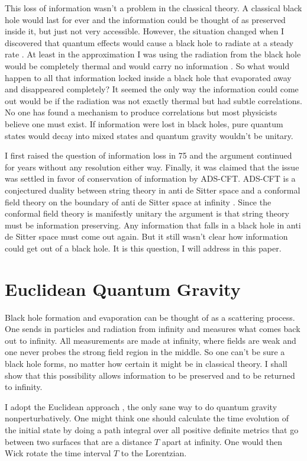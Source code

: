 \documentclass[aps,prd,groupedaddress,showpacs,12pt]{revtex4-1}
\begin{document}
This loss of information wasn't a problem in the classical theory. A classical black hole would last for ever and the information could be thought of as preserved inside it, but just not very accessible. However, the situation changed when I discovered that quantum effects would cause a black hole to radiate at a steady rate \cite{Stephen1}. At least in the approximation I was using the radiation from the black hole would be completely thermal and would carry no information \cite{Stephen2}. So what would happen to all that information locked inside a black hole that evaporated away and disappeared completely?  It seemed the only way the information could come out would be if the radiation was not exactly thermal but had subtle correlations. No one has found a mechanism to produce correlations but most physicists believe one must exist. If information were lost in black holes, pure quantum states would decay into mixed states and quantum gravity wouldn't be unitary.

I first raised the question of information loss in 75 and the argument continued for years without any resolution either way. Finally, it was claimed that the issue was settled in favor of conservation of information by ADS-CFT. 
ADS-CFT is a conjectured duality between string theory in anti de Sitter space and a conformal field theory on the boundary of anti de Sitter space at infinity \cite{ADSCFTreviews }. Since the conformal field theory is manifestly unitary the argument is that string theory must be information preserving. Any information that falls in a black hole in anti de Sitter space must come out again. But it still wasn't clear how information could get out of a black hole. It is this question, I will address in this paper. 

\section{Euclidean Quantum Gravity}


Black hole formation and evaporation can be thought of as a scattering process. One sends in particles and radiation from infinity and measures what comes back out to infinity. All measurements are made at infinity, where fields are weak and one never probes the strong field region in the middle. So one can't be sure a black hole forms, no matter how certain it might be in classical theory. I shall show that this possibility allows information to be preserved and to be returned to infinity. 

I adopt the Euclidean approach \cite{EQG}, the only sane way to do quantum gravity nonperturbatively. One might think one should calculate the time evolution of the initial state by doing a path integral over all positive definite metrics that go between two surfaces that are a distance $T$ apart at infinity. One would then Wick rotate the time interval $T$ to the Lorentzian. 
\end{document}

